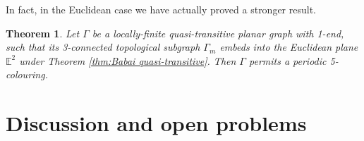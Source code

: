 \documentclass{article}
\numberwithin{equation}{section}
\newcommand{\EE}{\mathbb{E}}
\newtheorem{theorem}[lemma]{Theorem}
\theoremstyle{definition}
\theoremstyle{remark}
\begin{document}
In fact, in the Euclidean case we have actually proved a stronger result.
\begin{theorem}
    Let $\Gamma$ be a locally-finite quasi-transitive planar graph with 1-end, such that its 3-connected topological subgraph $\Gamma_m$ embeds into the Euclidean plane $\EE^2$ under Theorem \ref{thm:Babai quasi-transitive}. Then $\Gamma$ permits a periodic 5-colouring. 
\end{theorem}

\section{Discussion and open problems}\label{sec:discussion}
\end{document}
